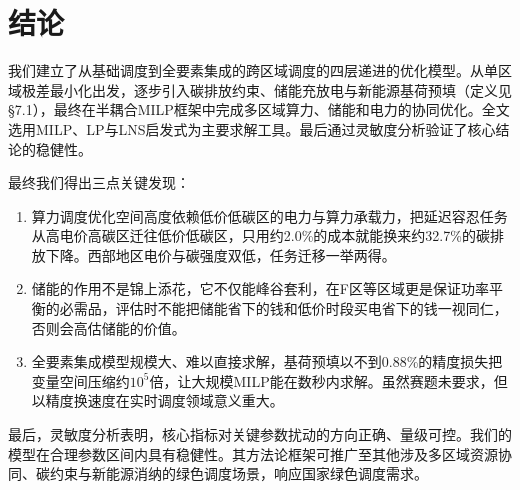 \section{结论}

我们建立了从基础调度到全要素集成的跨区域调度的四层递进的优化模型。从单区域极差最小化出发，逐步引入碳排放约束、储能充放电与新能源基荷预填（定义见 §7.1），最终在半耦合MILP框架中完成多区域算力、储能和电力的协同优化。全文选用MILP、LP与LNS启发式为主要求解工具。最后通过灵敏度分析验证了核心结论的稳健性。

最终我们得出三点关键发现：
\begin{enumerate}
\item 算力调度优化空间高度依赖低价低碳区的电力与算力承载力，把延迟容忍任务从高电价高碳区迁往低价低碳区，只用约2.0\%的成本就能换来约32.7\%的碳排放下降。西部地区电价与碳强度双低，任务迁移一举两得。
\item 储能的作用不是锦上添花，它不仅能峰谷套利，在F区等区域更是保证功率平衡的必需品，评估时不能把储能省下的钱和低价时段买电省下的钱一视同仁，否则会高估储能的价值。
\item 全要素集成模型规模大、难以直接求解，基荷预填以不到0.88\%的精度损失把变量空间压缩约$10^5$倍，让大规模MILP能在数秒内求解。虽然赛题未要求，但以精度换速度在实时调度领域意义重大。
\end{enumerate}

最后，灵敏度分析表明，核心指标对关键参数扰动的方向正确、量级可控。我们的模型在合理参数区间内具有稳健性。其方法论框架可推广至其他涉及多区域资源协同、碳约束与新能源消纳的绿色调度场景，响应国家绿色调度需求。